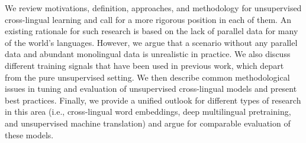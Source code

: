 We review motivations, definition, approaches, and methodology for unsupervised cross-lingual learning and call for a more rigorous position in each of them. An existing rationale for such research is based on the lack of parallel data for many of the world's languages. However, we argue that a scenario without any parallel data and abundant monolingual data is unrealistic in practice. We also discuss different training signals that have been used in previous work, which depart from the pure unsupervised setting. We then describe common methodological issues in tuning and evaluation of unsupervised cross-lingual models and present best practices. Finally, we provide a unified outlook for different types of research in this area (i.e., cross-lingual word embeddings, deep multilingual pretraining, and unsupervised machine translation) and argue for comparable evaluation of these models.
